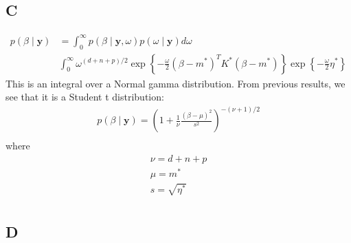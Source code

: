 \documentclass{article}
\begin{document}
\subsection*{C}
\begin{align*}
p(\beta \mid \mathbf{y}) &= \int_{0}^{\infty} p(\beta \mid \mathbf{y}, \omega) p(\omega \mid \mathbf{y}) d\omega\\
& \int_{0}^{\infty} \omega^{(d+n+p)/2} \exp \left\lbrace -\frac{\omega}{2}(\beta - m^*)^T K^* (\beta - m^*) \right\rbrace \exp \left\lbrace -\frac{\omega}{2} \eta^* \right\rbrace
\end{align*}
This is an integral over a Normal gamma distribution. From previous results, we see that it is a Student t distribution:
\begin{align*}
p(\beta \mid \mathbf{y}) = \left(1 + \frac{1}{\nu}\frac{(\beta-\mu)^2}{s^2}\right)^{-(\nu+1)/2}\\
\end{align*}
where 
\begin{align*}
\nu = d + n + p\\
\mu = m^*\\
s = \sqrt{\eta^*}\\
\end{align*}

\subsection*{D}
\end{document}

